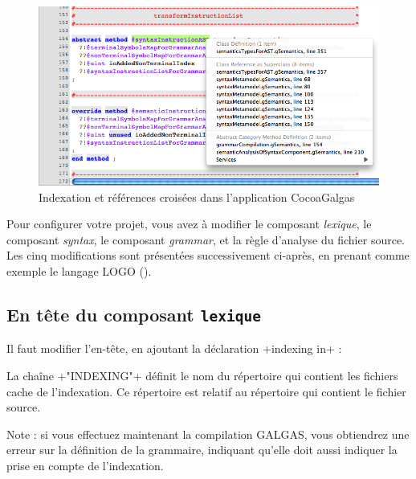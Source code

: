 
\begin{figure}[t]
  \centering
  \includegraphics[width=16cm]{chapter-cocoa-features/indexing-sample.png}
  \caption{Indexation et références croisées dans l'application CocoaGalgas}
  \ligne
\end{figure}

Pour configurer votre projet, vous avez à modifier le composant \emph{lexique}, le composant \emph{syntax}, le composant \emph{grammar}, et la règle d'analyse du fichier source. Les cinq modifications sont présentées successivement ci-après, en prenant comme exemple le langage LOGO ().





\subsection{En tête du composant \texttt{lexique}}

Il faut modifier l'en-tête, en ajoutant la déclaration  \ggs+indexing in+ :


\begin{galgas}
lexique logo_lexique indexing in "INDEXING" {
  ...
\end{galgas}

La chaîne \ggs+"INDEXING"+ définit le nom du répertoire qui contient les fichiers cache de l'indexation. Ce répertoire est relatif au répertoire qui contient le fichier source.

Note : si vous effectuez maintenant la compilation GALGAS, vous obtiendrez une erreur sur la définition de la grammaire, indiquant qu'elle doit aussi indiquer la prise en compte de l'indexation.




